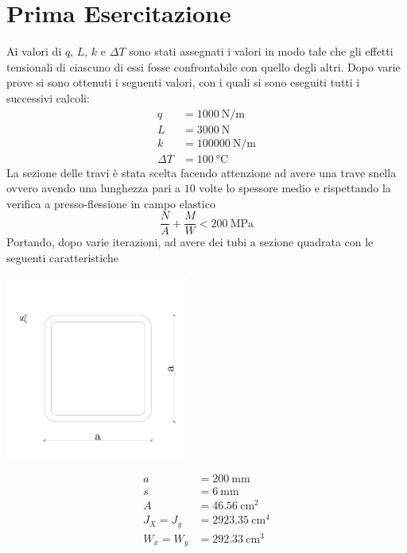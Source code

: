 \chapter{Prima Esercitazione}

Ai valori di $q$, $L$, $k$ e $\Delta T$ sono stati assegnati i valori in modo tale che gli effetti  tensionali di ciascuno di essi fosse confrontabile con quello degli altri. 
Dopo varie prove si sono ottenuti i seguenti valori, con i quali si sono eseguiti tutti i successivi calcoli:
\begin{align*}
	q &= \SI{1000}{\newton \per \metre}\\
	L &= \SI{3000}{\newton}\\
	k &= \SI{100000}{\newton \per \metre}\\
	\Delta T &= \SI{100}{\celsius}
\end{align*}
La sezione delle travi è stata scelta facendo attenzione ad avere una trave snella ovvero avendo una lunghezza pari a $10$ volte lo spessore medio e rispettando la verifica a presso-flessione in campo elastico 
\[
\frac{N}{A} + \frac{M}{W} < \SI{200}{\mega\pascal}
\]
Portando, dopo varie iterazioni, ad avere dei tubi a sezione quadrata con le seguenti caratteristiche
\begin{center}
\begin{minipage}{6cm}
	\includegraphics[width=60mm]{rel1/img1/tubi-quadri.pdf}
\end{minipage}
\begin{minipage}{6cm}
	\begin{align*}
		a &= \SI{200}{\milli\metre}\\
		s &= \SI{6}{\milli\metre}\\
		A &= \SI{46.56}{\centi\metre\squared}\\
		J_X = J_y &= \SI{2923.35}{\centi\metre\tothe{4}}\\
		W_x = W_y &= \SI{292.33}{\centi\metre\cubed}
	\end{align*}
\end{minipage}
\end{center}

	
	
    
    
